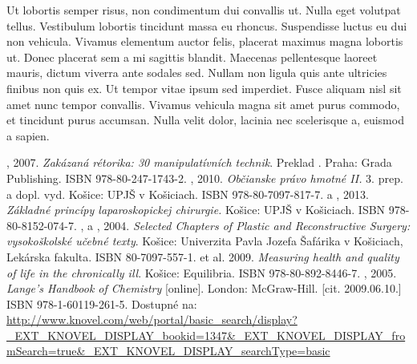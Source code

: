 \documentclass[thesismargins, thesislinespacing, twoside, openright, upjsfrontpage]{rnthesis}
\begin{document}
\zaver

Ut lobortis semper risus, non condimentum dui convallis ut. Nulla eget volutpat tellus. Vestibulum lobortis tincidunt massa eu rhoncus. Suspendisse luctus eu dui non vehicula. Vivamus elementum auctor felis, placerat maximus magna lobortis ut. Donec placerat sem a mi sagittis blandit. Maecenas pellentesque laoreet mauris, dictum viverra ante sodales sed. Nullam non ligula quis ante ultricies finibus non quis ex. Ut tempor vitae ipsum sed imperdiet. Fusce aliquam nisl sit amet nunc tempor convallis. Vivamus vehicula magna sit amet purus commodo, et tincidunt purus accumsan. Nulla velit dolor, lacinia nec scelerisque a, euismod a sapien. 
%

\begin{thebibliography}{9}
%
	, 2007. \emph{Zakázaná rétorika: 30 manipulatívních technik}. Preklad
. Praha: Grada Publishing. ISBN 978-80-247-1743-2.
	, 2010. \emph{Občianske právo hmotné II.} 3. prep. a dopl. vyd. Košice: UPJŠ v Košiciach. ISBN 978-80-7097-817-7.
	 a , 2013. \emph{Základné princípy laparoskopickej chirurgie.} Košice: UPJŠ v Košiciach. ISBN 978-80-8152-074-7.
	,  a , 2004. \emph{Selected Chapters of Plastic and Reconstructive Surgery: vysokoškolské učebné texty}. Košice: Univerzita Pavla Jozefa Šafárika v Košiciach, Lekárska fakulta. ISBN 80-7097-557-1.
	 et al. 2009. \emph{Measuring health and quality of life in the chronically ill}. Košice: Equilibria. ISBN 978-80-892-8446-7.
	, 2005. \emph{Lange's Handbook of Chemistry} [online]. London: McGraw-Hill. [cit. 2009.06.10.] ISBN 978-1-60119-261-5. Dostupné na: \url{http://www.knovel.com/web/portal/basic_search/display?_EXT_KNOVEL_DISPLAY_bookid=1347&_EXT_KNOVEL_DISPLAY_fromSearch=true&_EXT_KNOVEL_DISPLAY_searchType=basic}

\end{thebibliography}
\end{document}
